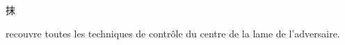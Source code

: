 \section{\Mo}
\Mo{} \begin{CJK*}{UTF8}{bsmi}抹\end{CJK*} recouvre toutes les techniques de contr\^{o}le du centre de la lame de l'adversaire. 
